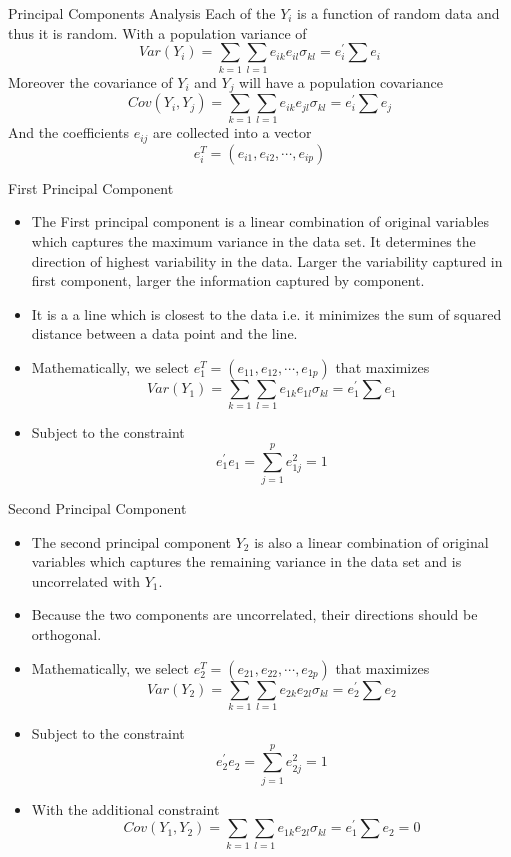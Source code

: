 \documentclass[10pt]{beamer}
\begin{document}
 \begin{frame}{Principal Components Analysis}
 Each of the $Y_{i}$ is a function of random data and thus it is random. With a population variance of 
 $$ Var(Y_{i})=\sum_{k=1} \sum_{l=1} e_{ik}e_{il}\sigma_{kl}=e_{i}^{'}\sum e_{i}$$
 Moreover the covariance of $Y_{i}$ and $Y_{j}$ will have a population covariance
 $$ Cov(Y_{i},Y_{j})=\sum_{k=1} \sum_{l=1} e_{ik}e_{jl}\sigma_{kl}=e_{i}^{'}\sum e_{j}$$
 And the coefficients $e_{ij}$ are collected into a vector
 $$e_{i}^{T}=(e_{i1},e_{i2},\cdots,e_{ip})$$
 
\end{frame}
\begin{frame}{First Principal Component}
\begin{itemize}
\item The First principal component is a linear combination of original variables which captures the maximum variance in the data set. It determines the direction of highest variability in the data. Larger the variability captured in first component, larger the information captured by component.\\
\item It is a a line which is closest to the data i.e. it minimizes the sum of squared distance between a data point and the line.\\
\item Mathematically, we select $e_{1}^{T}=(e_{11},e_{12},\cdots,e_{1p})$ that maximizes 
$$ Var(Y_{1})=\sum_{k=1} \sum_{l=1} e_{1k}e_{1l}\sigma_{kl}=e_{1}^{'}\sum e_{1}$$ 
\item Subject to the constraint $$e_{1}^{'}e_{1}=\sum_{j=1}^{p}e_{1j}^{2}=1$$
\end{itemize}

\end{frame}

\begin{frame}{Second Principal Component}
\begin{itemize}
\item The second principal component $Y_{2}$ is also a linear combination of original variables which captures the remaining variance in the data set and is uncorrelated with $Y_{1}$.
\item Because the two components are uncorrelated, their directions should be orthogonal.
\item Mathematically, we select $e_{2}^{T}=(e_{21},e_{22},\cdots,e_{2p})$ that maximizes 
$$ Var(Y_{2})=\sum_{k=1} \sum_{l=1} e_{2k}e_{2l}\sigma_{kl}=e_{2}^{'}\sum e_{2}$$ 
\item Subject to the constraint $$e_{2}^{'}e_{2}=\sum_{j=1}^{p}e_{2j}^{2}=1$$
\item With the additional constraint $$ Cov(Y_{1},Y_{2})=\sum_{k=1} \sum_{l=1} e_{1k}e_{2l}\sigma_{kl}=e_{1}^{'}\sum e_{2}=0$$
\end{itemize}
\end{frame}
\end{document}
